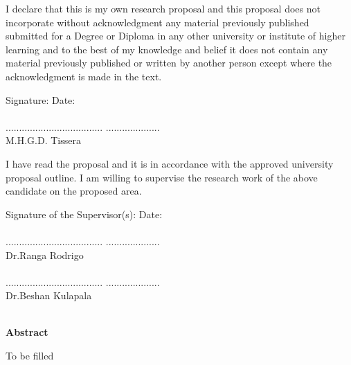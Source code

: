 \documentclass[a4paper,oneside,12pt]{report}
\begin{document}
I declare that this is my own research proposal and this proposal does not incorporate without acknowledgment any material previously published submitted for a Degree or Diploma in any other university or institute of higher learning and to the best of my knowledge and belief it does not contain any material previously published or written by another person except where the acknowledgment is made in the text.

Signature:  \hspace{7cm}  Date:\\
\\
.................................... \hspace{4.25cm} ....................\\
M.H.G.D. Tissera

I have read the proposal and it is in accordance with the approved university proposal outline. I am willing to supervise the research work of the above candidate on the proposed area.

Signature of the Supervisor(s):  \hspace{3.25cm}  Date:\\
\\
.................................... \hspace{4.25cm} ....................\\
Dr.Ranga Rodrigo\\
\\
.................................... \hspace{4.25cm} ....................\\
Dr.Beshan Kulapala\\
\\


\clearpage


\begin{flushleft}
	\large
	\textbf{Abstract}
\end{flushleft}
\small

To be filled 

\cite{R01} \cite{R02} \cite{R03} \cite{R04} \cite{R05} \cite{R06} \cite{R07} \cite{R08} \cite{R09} \cite{R10} \cite{R11} \cite{R12} \cite{R13} \cite{R14} \cite{R15} \cite{R16} \cite{R17} \cite{R18} \cite{R19} \cite{R20} \cite{R21} \cite{R22} \cite{R23} \cite{R24} \cite{R25} \cite{R26} \cite{R27} \cite{R28} \cite{R29} \cite{R30} \cite{R31} \cite{R32} \cite{R33} \cite{R34} \cite{R35} \cite{R36} \cite{R37} \cite{R38} \cite{R39} \cite{R40} \cite{R41} \cite{R42} \cite{R43} \cite{R44} \cite{R45} \cite{R46} \cite{R47} \cite{R48}
\cite{R49} \cite{R50} \cite{R51} \cite{R52} \cite{R53} \cite{R54} \cite{R55} \cite{R56} \cite{R57} \cite{R58} \cite{R59} \cite{R60}
\cite{R61} \cite{R62} \cite{R63} \cite{R64} \cite{R65} \cite{R66}
\end{document}
